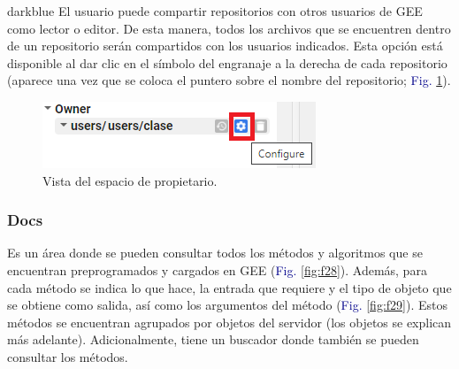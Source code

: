 \documentclass[
  12pt,
  letterpaper,
  twoside]{book}
\begin{document}
\begin{bluebox2}

\begin{awesomeblock}{5pt}{\faLightbulb}{darkblue}
El usuario puede compartir repositorios con otros usuarios de GEE como lector o editor. De esta manera, todos los archivos que se encuentren dentro de un repositorio serán compartidos con los usuarios indicados. Esta opción está disponible al dar clic en el símbolo del engranaje a la derecha de cada repositorio (aparece una vez que se coloca el puntero sobre el nombre del repositorio; \textcolor{darkblue}{Fig.} \ref{fig:f27}).

\end{awesomeblock}

\end{bluebox2}

\begin{figure}[H]

{\centering \includegraphics[width=0.6\linewidth]{Img/engranaje} 

}

\caption{Vista del espacio de propietario.}\label{fig:f27}
\end{figure}

\hypertarget{docs}{%
\subsubsection*{Docs}\label{docs}}

Es un área donde se pueden consultar todos los métodos y algoritmos que se encuentran preprogramados y cargados en GEE (\textcolor{darkblue}{Fig.} \ref{fig:f28}). Además, para cada método se indica lo que hace, la entrada que requiere y el tipo de objeto que se obtiene como salida, así como los argumentos del método (\textcolor{darkblue}{Fig.} \ref{fig:f29}). Estos métodos se encuentran agrupados por objetos del servidor (los objetos se explican más adelante). Adicionalmente, tiene un buscador donde también se pueden consultar los métodos.
\end{document}
